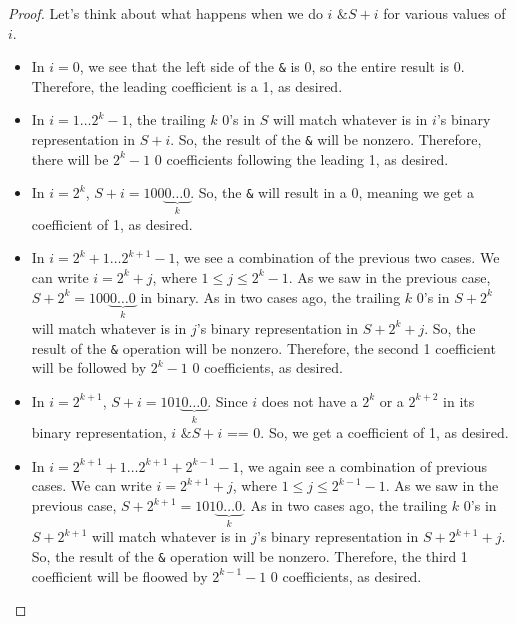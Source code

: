 \documentclass{article}
\begin{document}
\begin{proof}
		Let's think about what happens when we do $i \texttt{ \& } S + i$ for various values of $i$.
		\begin{itemize}
			\item
				In $i = 0$, we see that the left side of the \texttt{\&} is 0, so the entire result is 0. Therefore, the leading coefficient is a 1, as desired.
			\item
				In $i = 1 \dots 2^k - 1$, the trailing $k$ 0's in $S$ will match whatever is in $i$'s binary representation in $S + i$.
				So, the result of the \texttt{\&} will be nonzero.
				Therefore, there will be $2^k - 1$ 0 coefficients following the leading 1, as desired.
			\item
				In $i = 2^k$, $S + i = 100\underbrace{0 \dots 0}_{k}$.
				So, the \texttt{\&} will result in a 0, meaning we get a coefficient of 1, as desired.
			\item
				In $i = 2^k + 1 \dots 2^{k+1} - 1$, we see a combination of the previous two cases.
				We can write $i = 2^k + j$, where $1 \leq j \leq 2^{k} - 1$.
				As we saw in the previous case, $S + 2^k = 100\underbrace{0 \dots 0}_{k}$ in binary.
				As in two cases ago, the trailing $k$ 0's in $S + 2^k$ will match whatever is in $j$'s binary representation in $S + 2^k + j$.
				So, the result of the \texttt{\&} operation will be nonzero.
				Therefore, the second 1 coefficient will be followed by $2^k - 1$ 0 coefficients, as desired.
			\item
				In $i = 2^{k+1}$, $S + i = 101\underbrace{0 \dots 0}_{k}$.
				Since $i$ does not have a $2^k$ or a $2^{k+2}$ in its binary representation, $i \texttt{ \& } S+i \texttt{ == } 0$.
				So, we get a coefficient of 1, as desired.
			\item
				In $i = 2^{k+1} + 1 \dots 2^{k+1} + 2^{k-1} - 1$, we again see a combination of previous cases.
				We can write $i = 2^{k+1} + j$, where $1 \leq j \leq 2^{k-1} - 1$.
				As we saw in the previous case, $S + 2^{k+1} = 101\underbrace{0 \dots 0}_{k}$.
				As in two cases ago, the trailing $k$ 0's in $S + 2^{k+1}$ will match whatever is in $j$'s binary representation in $S + 2^{k+1} + j$.
				So, the result of the \texttt{\&} operation will be nonzero.
				Therefore, the third 1 coefficient will be floowed by $2^{k-1} - 1$ 0 coefficients, as desired.
		\end{itemize}	
	\end{proof}
\end{document}
